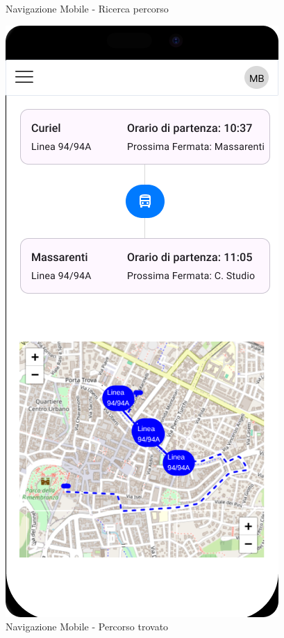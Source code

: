 \begin{figure}[H]
\begin{minipage}[b]{0.45\textwidth}
    \caption{Navigazione Mobile - Ricerca percorso}
    \label{fig:navigazione-cerca}
  \end{minipage}
  \hfill
  \begin{minipage}[b]{0.45\textwidth}
    \centering
    \includegraphics[width=\textwidth]{images/mockup/Percorso Trovato.png}
    \caption{Navigazione Mobile - Percorso trovato}
    \label{fig:navigazione-percorso}
  \end{minipage}
\end{figure}

